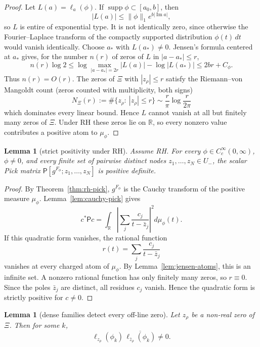 \documentclass[11pt]{amsart}
\newtheorem{lemma}[theorem]{Lemma}
\theoremstyle{definition}
\theoremstyle{remark}
\theoremstyle{definition}
\renewcommand{\Im}{\operatorname{Im}}
\newcommand{\R}{\mathbb{R}}
\begin{document}
\begin{proof}
Let $L(a)=\ell_a(\phi)$.  If $\operatorname{supp}\phi\subset[a_0,b]$, then
\[
   |L(a)|\le \|\phi\|_1e^{b|\Im a|},
\]
so $L$ is entire of exponential type.  It is not identically zero, since otherwise the Fourier--Laplace
transform of the compactly supported distribution $\phi(t)\,dt$ would vanish identically.  Choose
$a_*$ with $L(a_*)\ne0$.  Jensen's formula centered at $a_*$ gives, for the number $n(r)$ of zeros of
$L$ in $|a-a_*|\le r$,
\[
   n(r)\log2
   \le
   \log\max_{|a-a_*|=2r}|L(a)|-\log|L(a_*)|
   \le
   2br+C_\phi.
\]
Thus $n(r)=O(r)$.  The zeros of $\Xi$ with $|z_\rho|\le r$ satisfy the Riemann--von Mangoldt count (zeros counted with multiplicity, both signs)
\[
   N_\Xi(r):=\#\{z_\rho:\ |z_\rho|\le r\}\sim\frac{r}{\pi}\log\frac{r}{2\pi}
\]
which dominates every linear bound.  Hence $L$ cannot vanish at all but finitely many zeros of $\Xi$.
Under RH these zeros lie on $\R$, so every nonzero value contributes a positive atom to $\mu_\phi$.
\end{proof}

\begin{lemma}[strict positivity under RH]\label{lem:strict-pd}
Assume RH.  For every $\phi\in C_c^\infty(0,\infty)$, $\phi\ne0$, and every finite set of pairwise
distinct nodes $z_1,\ldots,z_N\in U_-$, the scalar Pick matrix
$\mathsf P[g^{F_\phi};z_1,\ldots,z_N]$ is positive definite.
\end{lemma}

\begin{proof}
By Theorem~\ref{thm:rh-pick}, $g^{F_\phi}$ is the Cauchy transform of the positive measure
$\mu_\phi$.  Lemma~\ref{lem:cauchy-pick} gives
\[
   c^*\mathsf P c
   =
   \int_\R\left|\sum_j\frac{c_j}{t-\bar z_j}\right|^2d\mu_\phi(t).
\]
If this quadratic form vanishes, the rational function
\[
   r(t)=\sum_j\frac{c_j}{t-\bar z_j}
\]
vanishes at every charged atom of $\mu_\phi$.  By Lemma~\ref{lem:jensen-atoms}, this is an infinite
set.  A nonzero rational function has only finitely many zeros, so $r\equiv0$.  Since the poles
$\bar z_j$ are distinct, all residues $c_j$ vanish.  Hence the quadratic form is strictly positive for
$c\ne0$.
\end{proof}

\begin{lemma}[dense families detect every off-line zero]\label{lem:dense-detection}
Let $z_\rho$ be a non-real zero of $\Xi$.  Then for some $k$,
\[
   \ell_{z_\rho}(\phi_k)\,\overline{\ell_{\bar z_\rho}(\phi_k)}\ne0.
\]
\end{lemma}
\end{document}
